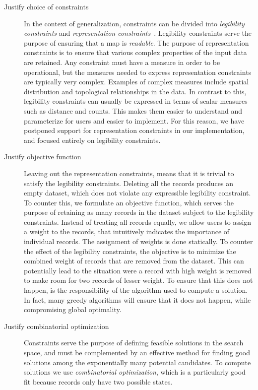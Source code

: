 \documentclass[11pt, oneside]{article}   	%
\begin{document}
\begin{description}
\item[Justify choice of constraints] 
In the context of generalization, constraints can be divided into \emph{legibility constraints} and \emph{representation constraints}~\cite{harrie2007modelling}. Legibility constraints serve the purpose of ensuring that a map is \emph{readable}. The purpose of representation constraints is to ensure that various complex properties of the input data are retained. Any constraint must have a measure in order to be operational, but the measures needed to express representation constraints are typically very complex. Examples of complex measures include spatial distribution and topological relationships in the data. In contrast to this, legibility constraints can usually be expressed in terms of scalar measures such as distance and counts. This makes them easier to understand and parameterize for users and easier to implement. For this reason, we have postponed support for representation constraints in our implementation, and focused entirely on legibility constraints.

\item[Justify objective function] Leaving out the representation constraints, means that it is trivial to satisfy the legibility constraints. Deleting all the records produces an empty dataset, which does not violate any expressible legibility constraint. To counter this, we formulate an objective function, which serves the purpose of retaining as many records in the dataset subject to the legibility constraints. Instead of treating all records equally, we allow users to assign a weight to the records, that intuitively indicates the importance of individual records. The assignment of weights is done statically. To counter the effect of the legibility constraints, the objective is to minimize the combined weight of records that are removed from the dataset. This can potentially lead to the situation were a record with high weight is removed to make room for two records of lesser weight. To ensure that this does not happen, is the responsibility of the algorithm used to compute a solution. In fact, many greedy algorithms will ensure that it does not happen, while compromising global optimality.

\item[Justify combinatorial optimization]
Constraints serve the purpose of defining feasible solutions in the search space, and must be complemented by an effective method for finding good solutions among the exponentially many potential candidates. To compute solutions we use \emph{combinatorial optimization}, which is a particularly good fit because records only have two possible states.


\end{description}
\end{document}
